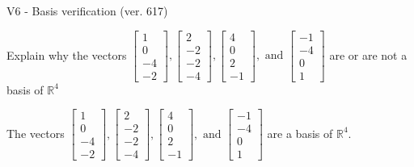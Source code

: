 \begin{exercise}
  \begin{exerciseTitle}V6 - Basis verification (ver. 617)\end{exerciseTitle}
  \begin{exerciseStatement}
    Explain why the vectors \(\left[\begin{array}{r}
1 \\
0 \\
-4 \\
-2
\end{array}\right] , \left[\begin{array}{r}
2 \\
-2 \\
-2 \\
-4
\end{array}\right] , \left[\begin{array}{r}
4 \\
0 \\
2 \\
-1
\end{array}\right] , \text{ and } \left[\begin{array}{r}
-1 \\
-4 \\
0 \\
1
\end{array}\right]\) are or are not a basis of \(\mathbb{R}^4\)	


  \end{exerciseStatement}
  \begin{exerciseAnswer}
   The vectors \(\left[\begin{array}{r}
1 \\
0 \\
-4 \\
-2
\end{array}\right] , \left[\begin{array}{r}
2 \\
-2 \\
-2 \\
-4
\end{array}\right] , \left[\begin{array}{r}
4 \\
0 \\
2 \\
-1
\end{array}\right] , \text{ and } \left[\begin{array}{r}
-1 \\
-4 \\
0 \\
1
\end{array}\right]\) 
  	 are  a basis of \(\mathbb{R}^4\).
  


  \end{exerciseAnswer}
\end{exercise}
